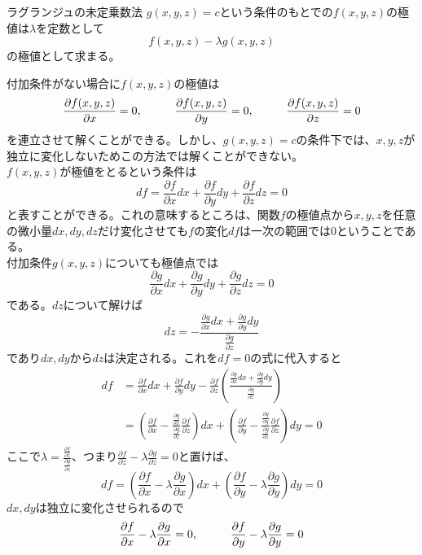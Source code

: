 \documentclass{jsarticle}
\begin{document}
\begin{itembox}[l]{ラグランジュの未定乗数法}
\(g(x,y,z)=c\)という条件のもとでの\(f(x,y,z)\)の極値は\(\lambda\)を定数として
\[f(x,y,z)-\lambda g(x,y,z)\]
の極値として求まる。
\end{itembox}
付加条件がない場合に\(f(x,y,z)\)の極値は
\[\frac{\partial f(x,y,z)}{\partial x}=0,\hspace{10mm}\frac{\partial f(x,y,z)}{\partial y}=0,\hspace{10mm}\frac{\partial f(x,y,z)}{\partial z}=0\]
を連立させて解くことができる。しかし、\(g(x,y,z)=c\)の条件下では、\(x,y,z\)が独立に変化しないためこの方法では解くことができない。\\
\(f(x,y,z)\)が極値をとるという条件は
\[df=\frac{\partial f}{\partial x}dx+\frac{\partial f}{\partial y}dy+\frac{\partial f}{\partial z}dz=0\]
と表すことができる。これの意味するところは、関数\(f\)の極値点から\(x,y,z\)を任意の微小量\(dx,dy,dz\)だけ変化させても\(f\)の変化\(df\)は一次の範囲では\(0\)ということである。\\
付加条件\(g(x,y,z)\)についても極値点では
\[\frac{\partial g}{\partial x}dx+\frac{\partial g}{\partial y}dy+\frac{\partial g}{\partial z}dz=0\]
である。\(dz\)について解けば
\[dz=-\frac{\frac{\partial g}{\partial x}dx+\frac{\partial g}{\partial y}dy}{\frac{\partial
 g}{\partial z}}\]
であり\(dx,dy\)から\(dz\)は決定される。これを\(df=0\)の式に代入すると
\begin{align*}
df&=\frac{\partial f}{\partial x}dx+\frac{\partial f}{\partial y}dy-\frac{\partial f}{\partial z}\left(\frac{\frac{\partial g}{\partial x}dx+\frac{\partial g}{\partial y}dy}{\frac{\partial g}{\partial z}}\right)\\
&=\left(\frac{\partial f}{\partial x}-\frac{\frac{\partial g}{\partial x}}{\frac{\partial g}{\partial z}}\frac{\partial f}{\partial z}\right)dx+\left(\frac{\partial f}{\partial y}-\frac{\frac{\partial g}{\partial y}}{\frac{\partial g}{\partial z}}\frac{\partial f}{\partial z}\right)dy=0
\end{align*}
ここで\(\lambda=\frac{\frac{\partial f}{\partial z}}{\frac{\partial g}{\partial z}}\)、つまり\(\frac{\partial f}{\partial z}-\lambda\frac{\partial g}{\partial z}=0\)と置けば、
\[df=\left(\frac{\partial f}{\partial x}-\lambda\frac{\partial g}{\partial x}\right)dx+\left(\frac{\partial f}{\partial y}-\lambda\frac{\partial g}{\partial y}\right)dy=0\]
\(dx,dy\)は独立に変化させられるので
\[\frac{\partial f}{\partial x}-\lambda\frac{\partial g}{\partial x}=0,\hspace{10mm}\frac{\partial f}{\partial y}-\lambda\frac{\partial g}{\partial y}=0\]
\end{document}
